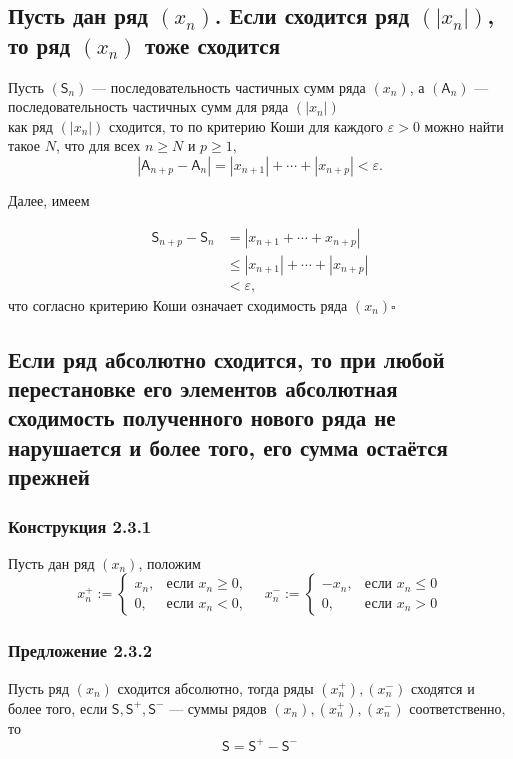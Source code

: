 \documentclass[a4paper]{article}
\newcommand{\qed}{\hfill$\square$}
\begin{document}
\subsection{Пусть дан ряд $(x_n)$. Если сходится ряд $(|x_n|)$, то ряд $(x_n)$ тоже сходится}
\label{2.2}
Пусть $(\mathsf{S}_n)$ — последовательность частичных сумм ряда $(x_n)$, а $(\mathsf{A}_n)$ — последовательность частичных сумм для ряда $(|x_n|)$\\[2mm]
 как ряд $(|x_n|)$ сходится, то по критерию Коши для каждого $\varepsilon >0$ можно найти такое $N$, что для всех $n \geqslant N$ и $p \geqslant 1$,  
$$
| \mathsf{A}_{n+p} - \mathsf{A}_{n} | = |x_{n+1} | + \cdots +|x_{n+p}| < \varepsilon.
$$

Далее, имеем 

$$\begin{aligned}
\mathsf{S}_{n+p} - \mathsf{S}_n &= | x_{n+1} + \cdots + x_{n+p} | \\
&\leqslant  |x_{n+1}| + \cdots + |x_{n+p}| \\
&< \varepsilon,
\end{aligned}$$
что согласно критерию Коши  означает сходимость ряда $(x_n)$\qed 

\subsection{Если ряд абсолютно сходится, то при любой перестановке его элементов абсолютная сходимость полученного нового ряда не нарушается и более того, его сумма
остаётся прежней}
\subsubsection*{Конструкция 2.3.1}
Пусть дан ряд $(x_n)$, положим\label{2.1}
\begin{equation}\label{eq:1}
    x_n^+:=\begin{cases}
        x_n,&\text{если } x_n\geqslant0,\\
        0,&\text{если } x_n<0,
    \end{cases}\quad x_n^-:=\begin{cases}
        -x_n,&\text{если } x_n\leqslant0\\
        0,&\text{если } x_n>0
    \end{cases}
\end{equation}
\subsubsection*{Предложение 2.3.2}
Пусть ряд $(x_n)$ сходится абсолютно, тогда ряды $(x_n^+),(x_n^-)$ сходятся и более того, если $\mathsf{S},\mathsf{S}^+,\mathsf{S}^-$ — суммы рядов $(x_n),(x_n^+),(x_n^-)$ соответственно, то
\begin{equation}\label{eq:2}
    \mathsf{S}=\mathsf{S}^+-\mathsf{S}^-
\end{equation}
\end{document}
